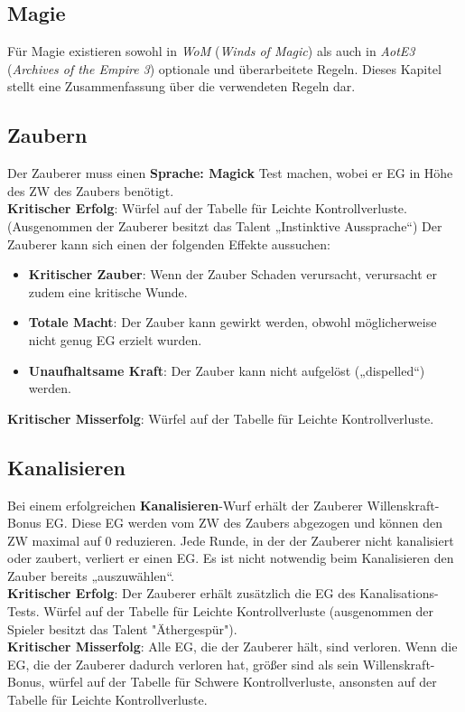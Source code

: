 \documentclass[a4paper]{article}
\begin{document}
\begin{multicols}{2}
\clearpage
\section{Magie}

Für Magie existieren sowohl in \textit{WoM} (\textit{Winds of Magic}) als auch in \textit{AotE3} (\textit{Archives of the Empire 3}) optionale und überarbeitete Regeln.
Dieses Kapitel stellt eine Zusammenfassung über die verwendeten Regeln dar.

\subsection{Zaubern}
Der Zauberer muss einen \textbf{Sprache: Magick} Test machen, wobei er EG in Höhe des ZW des Zaubers benötigt.\\
\textbf{Kritischer Erfolg}: Würfel auf der Tabelle für Leichte Kontrollverluste. (Ausgenommen der Zauberer besitzt das Talent „Instinktive Aussprache“) Der Zauberer kann sich einen der folgenden Effekte aussuchen:
\begin{itemize}
  \item \textbf{Kritischer Zauber}: Wenn der Zauber Schaden verursacht, verursacht er zudem eine kritische Wunde.
  \item \textbf{Totale Macht}: Der Zauber kann gewirkt werden, obwohl möglicherweise nicht genug EG erzielt wurden.
  \item \textbf{Unaufhaltsame Kraft}: Der Zauber kann nicht aufgelöst („dispelled“) werden.
\end{itemize}
\textbf{Kritischer Misserfolg}: Würfel auf der Tabelle für Leichte Kontrollverluste.

\subsection{Kanalisieren}
Bei einem erfolgreichen \textbf{Kanalisieren}-Wurf erhält der Zauberer Willenskraft-Bonus EG. Diese EG werden vom ZW des Zaubers abgezogen und können den ZW maximal auf 0 reduzieren.
Jede Runde, in der der Zauberer nicht kanalisiert oder zaubert, verliert er einen EG.
Es ist nicht notwendig beim Kanalisieren den Zauber bereits „auszuwählen“.\\
\textbf{Kritischer Erfolg}: Der Zauberer erhält zusätzlich die EG des Kanalisations-Tests. Würfel auf der Tabelle für Leichte Kontrollverluste (ausgenommen der Spieler besitzt das Talent "Äthergespür").\\
\textbf{Kritischer Misserfolg}: Alle EG, die der Zauberer hält, sind verloren. Wenn die EG, die der Zauberer dadurch verloren hat, größer sind als sein Willenskraft-Bonus, würfel auf der Tabelle für Schwere Kontrollverluste, ansonsten auf der Tabelle für Leichte Kontrollverluste.


\end{multicols}
\end{document}
